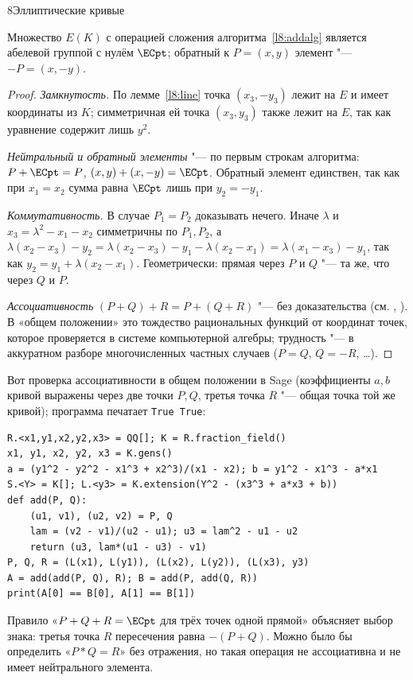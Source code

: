 \begin{lecture}{8}{Эллиптические кривые}
\begin{theorem}\label{l8:group}
Множество $E(K)$ с операцией сложения алгоритма~\ref{l8:addalg} является абелевой группой
с нулём $\ECpt$; обратный к $P = (x, y)$ элемент "--- $-P = (x, -y)$.
\end{theorem}

\begin{proof}
\emph{Замкнутость.} По лемме~\ref{l8:line} точка $(x_3, -y_3)$ лежит на $E$ и имеет координаты
из $K$; симметричная ей точка $(x_3, y_3)$ также лежит на $E$, так как уравнение содержит лишь
$y^2$.

\emph{Нейтральный и обратный элементы} "--- по первым строкам алгоритма: $P + \ECpt = P$,
$(x, y) + (x, -y) = \ECpt$. Обратный элемент единствен, так как при $x_1 = x_2$ сумма равна
$\ECpt$ лишь при $y_2 = -y_1$.

\emph{Коммутативность.} В случае $P_1 = P_2$ доказывать нечего. Иначе $\lambda$ и
$x_3 = \lambda^2 - x_1 - x_2$ симметричны по $P_1, P_2$, а
$\lambda(x_2 - x_3) - y_2 = \lambda(x_2 - x_3) - y_1 - \lambda(x_2 - x_1) = \lambda(x_1 - x_3) - y_1$,
так как $y_2 = y_1 + \lambda(x_2 - x_1)$. Геометрически: прямая через $P$ и $Q$ "--- та же, что
через $Q$ и $P$.

\emph{Ассоциативность} $(P + Q) + R = P + (Q + R)$ "--- без доказательства (см.
\cite[разд.~2.4]{washington}, \cite[гл.~III, \S\,3]{silverman-aec}). В «общем положении» это
тождество рациональных функций от координат точек, которое проверяется в системе
компьютерной алгебры; трудность "--- в аккуратном разборе многочисленных частных случаев
($P = Q$, $Q = -R$, \dots).
\end{proof}

Вот проверка ассоциативности в общем положении в Sage (коэффициенты $a, b$ кривой выражены
через две точки $P, Q$, третья точка $R$ "--- общая точка той же кривой); программа печатает
\texttt{True True}:
{\small
\begin{verbatim}
R.<x1,y1,x2,y2,x3> = QQ[]; K = R.fraction_field()
x1, y1, x2, y2, x3 = K.gens()
a = (y1^2 - y2^2 - x1^3 + x2^3)/(x1 - x2); b = y1^2 - x1^3 - a*x1
S.<Y> = K[]; L.<y3> = K.extension(Y^2 - (x3^3 + a*x3 + b))
def add(P, Q):
    (u1, v1), (u2, v2) = P, Q
    lam = (v2 - v1)/(u2 - u1); u3 = lam^2 - u1 - u2
    return (u3, lam*(u1 - u3) - v1)
P, Q, R = (L(x1), L(y1)), (L(x2), L(y2)), (L(x3), y3)
A = add(add(P, Q), R); B = add(P, add(Q, R))
print(A[0] == B[0], A[1] == B[1])
\end{verbatim}
}

\begin{remark}
Правило «$P + Q + R = \ECpt$ для трёх точек одной прямой» объясняет выбор знака: третья точка
$R$ пересечения равна $-(P + Q)$. Можно было бы определить «$P * Q = R$» без отражения, но
такая операция не ассоциативна и не имеет нейтрального элемента.
\end{remark}


\end{lecture}
